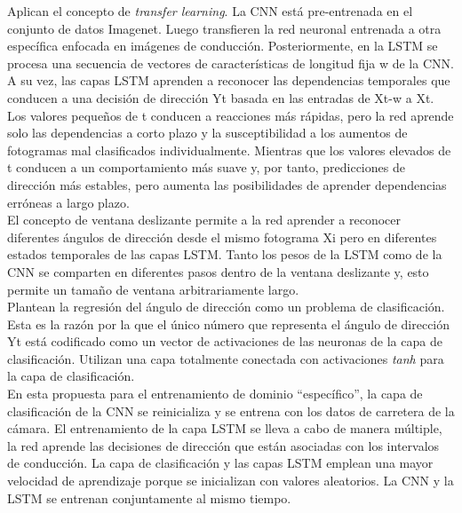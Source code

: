 Aplican el concepto de \textit{transfer learning}. La CNN está pre-entrenada en el conjunto de datos Imagenet. Luego transfieren la red neuronal entrenada a otra específica enfocada en imágenes de conducción. Posteriormente, en la LSTM se procesa una secuencia de vectores de características de longitud fija w de la CNN. A su vez, las capas LSTM aprenden a reconocer las dependencias temporales que conducen a una decisión de dirección Yt basada en las entradas de Xt-w a Xt. Los valores pequeños de t conducen a reacciones más rápidas, pero la red aprende solo las dependencias a corto plazo y la susceptibilidad a los aumentos de fotogramas mal clasificados individualmente. Mientras que los valores elevados de t conducen a un comportamiento más suave y, por tanto, predicciones de dirección más estables, pero aumenta las posibilidades de aprender dependencias erróneas a largo plazo.\\

El concepto de ventana deslizante permite a la red aprender a reconocer diferentes ángulos de dirección desde el mismo fotograma Xi pero en diferentes estados temporales de las capas LSTM. Tanto los pesos de la LSTM como de la CNN se comparten en diferentes pasos dentro de la ventana deslizante y, esto permite un tamaño de ventana arbitrariamente largo.\\

Plantean la regresión del ángulo de dirección como un problema de clasificación. Esta es la razón por la que el único número que representa el ángulo de dirección Yt está codificado como un vector de activaciones de las neuronas de la capa de clasificación. Utilizan una capa totalmente conectada con activaciones \textit{tanh} para la capa de clasificación.\\

En esta propuesta para el entrenamiento de dominio ``específico'', la capa de clasificación de la CNN se reinicializa y se entrena con los datos de carretera de la cámara. El entrenamiento de la capa LSTM se lleva a cabo de manera múltiple, la red aprende las decisiones de dirección que están asociadas con los intervalos de conducción. La capa de clasificación y las capas LSTM emplean una mayor velocidad de aprendizaje porque se inicializan con valores aleatorios. La CNN y la LSTM se entrenan conjuntamente al mismo tiempo.\\

